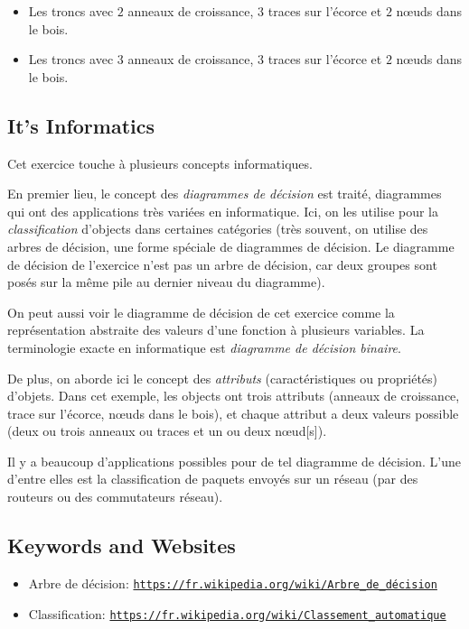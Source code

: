 \documentclass[a4paper,11pt]{report}
\newcommand{\BrochureUrlText}[1]{\texttt{#1}}
\begin{document}
\begin{itemize}
  \item Les troncs avec $2$ anneaux de croissance, $3$ traces sur l’écorce et $2$ nœuds dans le bois.
  \item Les troncs avec $3$ anneaux de croissance, $3$ traces sur l’écorce et $2$ nœuds dans le bois.
\end{itemize}


\subsection*{It’s Informatics}

Cet exercice touche à plusieurs concepts informatiques.

En premier lieu, le concept des \emph{diagrammes de décision} est traité, diagrammes qui ont des applications très variées en informatique. Ici, on les utilise pour la \emph{classification} d’objects dans certaines catégories (très souvent, on utilise des arbres de décision, une forme spéciale de diagrammes de décision. Le diagramme de décision de l’exercice n’est pas un arbre de décision, car deux groupes sont posés sur la même pile au dernier niveau du diagramme).

On peut aussi voir le diagramme de décision de cet exercice comme la représentation abstraite des valeurs d’une fonction à plusieurs variables. La terminologie exacte en informatique est \emph{diagramme de décision binaire}.

De plus, on aborde ici le concept des \emph{attributs} (caractéristiques ou propriétés) d’objets. Dans cet exemple, les objects ont trois attributs (anneaux de croissance, trace sur l’écorce, nœuds dans le bois), et chaque attribut a deux valeurs possible (deux ou trois anneaux ou traces et un ou deux nœud[s]).

Il y a beaucoup d’applications possibles pour de tel diagramme de décision. L’une d’entre elles est la classification de paquets envoyés sur un réseau (par des routeurs ou des commutateurs réseau).

{\raggedright

\subsection*{Keywords and Websites}

\begin{itemize}
  \item Arbre de décision: \href{https://fr.wikipedia.org/wiki/Arbre_de_d\%C3\%A9cision}{\BrochureUrlText{https://fr.wikipedia.org/wiki/Arbre\_de\_décision}}
  \item Classification: \href{https://fr.wikipedia.org/wiki/Classement_automatique}{\BrochureUrlText{https://fr.wikipedia.org/wiki/Classement\_automatique}}
\end{itemize}


}
\end{document}
